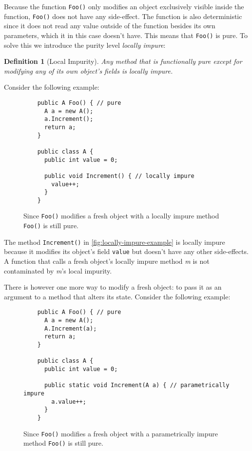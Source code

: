 \documentclass[a4paper,12pt]{article}
\newtheorem{definition}{Definition} %
\begin{document}
Because the function \texttt{Foo()} only modifies an object exclusively visible inside the function, \texttt{Foo()} does not have any side-effect. The function is also deterministic since it does not read any value outside of the function besides its own parameters, which it in this case doesn't have. This means that \texttt{Foo()} is pure. To solve this we introduce the purity level \textit{locally impure}:

\begin{definition}[Local Impurity] \label{def:locally-impure}
  Any method that is functionally pure except for modifying any of its own object's fields is locally impure.
\end{definition}

Consider the following example:

\begin{figure}[H]
  \centering
  \begin{lstlisting}
    public A Foo() { // pure
      A a = new A();
      a.Increment();
      return a;
    }

    public class A {
      public int value = 0;

      public void Increment() { // locally impure
        value++;
      }
    }
  \end{lstlisting}
  \caption{Since \texttt{Foo()} modifies a fresh object with a locally impure method \texttt{Foo()} is still pure.}
  \label{fig:locally-impure-example}
\end{figure}

The method \texttt{Increment()} in \autoref{fig:locally-impure-example} is locally impure because it modifies its object's field \texttt{value} but doesn't have any other side-effects. A function that calls a fresh object's locally impure method \textit{m} is not contaminated by \textit{m}'s local impurity.

There is however one more way to modify a fresh object: to pass it as an argument to a method that alters its state. Consider the following example:

\begin{figure}[H]
  \centering
  \begin{lstlisting}
    public A Foo() { // pure
      A a = new A();
      A.Increment(a);
      return a;
    }

    public class A {
      public int value = 0;

      public static void Increment(A a) { // parametrically impure
        a.value++;
      }
    }
  \end{lstlisting}
  \caption{Since \texttt{Foo()} modifies a fresh object with a parametrically impure method \texttt{Foo()} is still pure.}
  \label{fig:parametrically-impure-example}
\end{figure}
\end{document}
